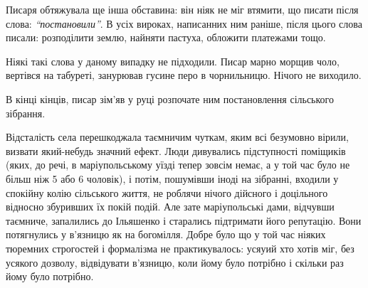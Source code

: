 \documentclass[a4paper,20pt]{report}
\begin{document}
Писаря обтяжувала ще інша обставина: він ніяк не міг втямити, що писати після слова: \emph{``постановили''}.
В усіх вироках, написанних ним раніше, після цього слова писали: розподілити землю, найняти пастуха,
обложити платежами тощо.

Ніякі такі слова у даному випадку не підходили. Писар марно морщив чоло,
вертівся на табуреті, занурював гусине перо в чорнильницю. Нічого не виходило.

В кінці кінців, писар зім'яв у руці розпочате ним постановлення сільського зібрання.

Відсталість села перешкоджала таємничим чуткам, яким всі безумовно вірили,
визвати який-небудь значний ефект. Люди дивувались підступності поміщиків
(яких, до речі, в маріупольському уїзді тепер зовсім немає, а у той час було не
більш ніж 5 або 6 чоловік), і потім, пошумівши іноді на зібранні, входили у
спокійну колію сільського життя, не роблячи нічого дійсного і доцільного
відносно збуривших їх покій подій.
Але зате маріупольські дами, відчувши таємниче, запалились до Ільяшенко і
старались підтримати його репутацію. Вони потягнулись у в'язницю як на
богомілля.  Добре було що у той час ніяких тюремних строгостей і формалізма не
практикувалось: усяуий хто хотів міг, без усякого дозволу, відвідувати
в'язницю, коли йому було потрібно і скільки раз йому було потрібно.
\end{document}
